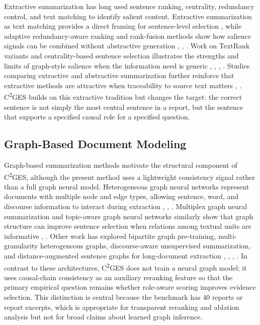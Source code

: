 \documentclass{ieeeaccess}
\begin{document}
Extractive summarization has long used sentence ranking, centrality, redundancy control, and text matching to identify salient content. Extractive summarization as text matching provides a direct framing for sentence-level selection \cite{zhong2020extractive}, while adaptive redundancy-aware ranking and rank-fusion methods show how salience signals can be combined without abstractive generation \cite{bi2021aredsum}, \cite{joshi2022ranksuman}, \cite{joshi2024ranksum}. Work on TextRank variants and centrality-based sentence selection illustrates the strengths and limits of graph-style salience when the information need is generic \cite{khor2021text}, \cite{kazemi2020biased}, \cite{belwal2020graphbased}, \cite{verma2023graphbased}. Studies comparing extractive and abstractive summarization further reinforce that extractive methods are attractive when traceability to source text matters \cite{giarelis2023abstractive}, \cite{abdelsalam2022performance}. C\textsuperscript{2}GES builds on this extractive tradition but changes the target: the correct sentence is not simply the most central sentence in a report, but the sentence that supports a specified causal role for a specified question.

\subsection{Graph-Based Document Modeling}

\label{sec:graph_based_document_modeling}

Graph-based summarization methods motivate the structural component of C\textsuperscript{2}GES, although the present method uses a lightweight consistency signal rather than a full graph neural model. Heterogeneous graph neural networks represent documents with multiple node and edge types, allowing sentence, word, and discourse information to interact during extraction \cite{wang2020heterogeneous}, \cite{jia2020neural}, \cite{huang2021extractive}. Multiplex graph neural summarization and topic-aware graph neural networks similarly show that graph structure can improve sentence selection when relations among textual units are informative \cite{jing2021multiplex}, \cite{cui2020enhancing}. Other work has explored bipartite graph pre-training, multi-granularity heterogeneous graphs, discourse-aware unsupervised summarization, and distance-augmented sentence graphs for long-document extraction \cite{mao2023bipartite}, \cite{zhao2023multigranularity}, \cite{dong2021discourseaware}, \cite{liu2021unsupervised}. In contrast to these architectures, C\textsuperscript{2}GES does not train a neural graph model; it uses causal-chain consistency as an auxiliary reranking feature so that the primary empirical question remains whether role-aware scoring improves evidence selection. This distinction is central because the benchmark has 40 reports or report excerpts, which is appropriate for transparent reranking and ablation analysis but not for broad claims about learned graph inference.
\end{document}

